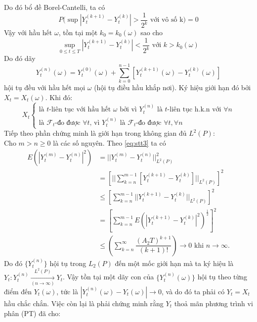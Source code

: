 \documentclass[14pt,a4paper]{article}
\numberwithin{equation}{section}
\begin{document}
Do đó bổ đề Borel-Cantelli, ta có
\begin{equation*}
	P(\sup{|Y_t^{(k+1)}-Y_t^{(k)}|}>\dfrac{1}{2^k} \text{ với vô số k)}=0
\end{equation*}
Vậy với hầu hết $\omega$, tồn tại một $k_0=k_0(\omega)$ sao cho
\begin{equation*}
	\sup_{0\leq t\leq T}|Y_t^{(k+1)}-Y_t^{(k)}|<\dfrac{1}{2^k}\text{ với }k>k_0(\omega)
\end{equation*}
Do đó dãy
\begin{equation*}
	Y_t^{(n)}(\omega)=Y_t^{(0)}(\omega)+\sum_{k=0}^{n-1}[Y_t^{(k+1)}(\omega)-Y_t^{(k)}(\omega)]
\end{equation*}
hội tụ đều với hầu hết mọi $\omega$ (hội tụ điều hầu khắp nơi). Ký hiệu giới hạn đó bởi $X_t=X_t(\omega)$. Khi đó:
\begin{equation*}
	X_t\begin{cases}
		\text{là $t$-liên tục với hầu hết $\omega$ bởi vì $Y_t^{(n)}$ là $t$-liên tục h.k.n với $\forall n$}\\
		\text{là $\mathscr{F}_t$-đo được $\forall t$, vì $Y_t^{(n)}$ là $\mathscr{F}_t$-đo được $\forall t,\forall n$}
	\end{cases}
\end{equation*}
Tiếp theo phần chứng minh là giới hạn trong không gian đủ $L^2(P)$:\\
Cho $m>n\geq0$ là các số nguyên. Theo \eqref{eq:stt3} ta có
\begin{equation*}
	\begin{split}
		E(|Y_t^{(m)}-Y_t^{(n)}|^2)&=||Y_t^{(m)}-Y_t^{(n)}||^2_{L^2(P)}\\
		&=\left[||\sum_{k=n}^{m-1}[Y_t^{(k+1)}-Y_t^{(k)}]||_{L^2(P)}\right]^2\\
		&\leq\left[\sum_{k=n}^{m-1}||Y_t^{(k+1)}-Y_t^{(k)}||_{L^2(P)}\right]^2\\
		&=\left[\sum_{k=n}^{m-1}E(|Y_t^{(k+1)}-Y_t^{(k)}|^2)^{\frac{1}{2}}\right]^2\\
		&\leq\left(\sum_{k=n}^{\infty}\dfrac{(A_2T)^{k+1}}{(k+1)!}\right)\longrightarrow0\text{ khi }n\rightarrow\infty.
	\end{split}
\end{equation*}
Do đó $\{Y_t^{(n)}\}$ hội tụ trong $L_2(P)$ đến một mốc giới hạn mà ta ký hiệu là $Y_t:Y_t^{(n)}\xrightarrow [ (n\rightarrow\infty) ]{ L^2(P) }Y_t$. Vậy tồn tại một dãy con của $\{Y_t^{(n)}(\omega)\}$ hội tụ theo từng điểm đến $Y_t(\omega)$, tức là $|Y_t^{(n)}(\omega)-Y_t(\omega)|\rightarrow0$, và do đó ta phải có $Y_t=X_t$ hầu chắc chắn. Việc còn lại là phải chứng minh rằng $Y_t$ thoả mãn phương trình vi phân (PT) đã cho:\\
\end{document}
